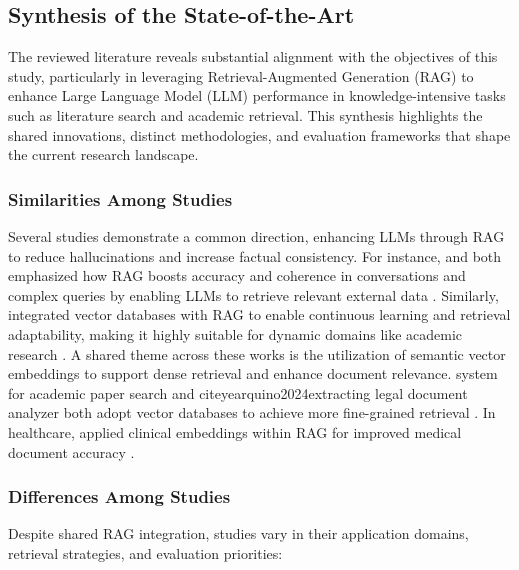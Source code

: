 \begin{refsection}
\section{Synthesis of the State-of-the-Art}

\hspace{1cm}The reviewed literature reveals substantial alignment with the objectives of this study, particularly in leveraging Retrieval-Augmented Generation (RAG) to enhance Large Language Model (LLM) performance in knowledge-intensive tasks such as literature search and academic retrieval. This synthesis highlights the shared innovations, distinct methodologies, and evaluation frameworks that shape the current research landscape.

\subsubsection{Similarities Among Studies}
Several studies demonstrate a common direction, enhancing LLMs through RAG to reduce hallucinations and increase factual consistency. For instance, \citeauthor{thapa2022splitfed} \citeyear{thapa2022splitfed} and  \citeauthor{thomo2024pubmed} \citeyear{thomo2024pubmed} both emphasized how RAG boosts accuracy and coherence in conversations and complex queries by enabling LLMs to retrieve relevant external data \cite{thapa2022splitfed}. Similarly, \citeauthor{lewis2020retrieval} \citeyear{lewis2020retrieval} integrated vector databases with RAG to enable continuous learning and retrieval adaptability, making it highly suitable for dynamic domains like academic research \cite{lewis2020retrieval}.
A shared theme across these works is the utilization of semantic vector embeddings to support dense retrieval and enhance document relevance.\citeauthor{grigoryan2024building} \citeyear{grigoryan2024building} system for academic paper search and \citeauthor{aquino2024extracting} citeyear{quino2024extracting} legal document analyzer both adopt vector databases to achieve more fine-grained retrieval \cite{grigoryan2024building, aquino2024extracting}. In healthcare, \citeauthor{arzideh2024miracle} \citeyear{arzideh2024miracle} applied clinical embeddings within RAG for improved medical document accuracy \cite{arzideh2024miracle}.


\subsubsection{Differences Among Studies}
Despite shared RAG integration, studies vary in their application domains, retrieval strategies, and evaluation priorities:


\end{refsection}
